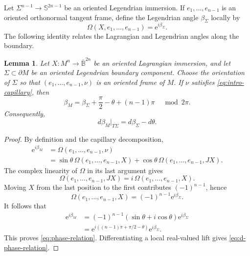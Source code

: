 \documentclass[11pt,a4paper]{article}
\numberwithin{equation}{section}
\newtheorem{lemma}[theorem]{Lemma}
\newcommand{\B}{\mathbb B}
\newcommand{\Sph}{\mathbb S}
\newcommand{\ee}{\mathrm e}
\begin{document}
Let $\Sigma^{n-1}\to\Sph^{2n-1}$ be an oriented Legendrian immersion.  If $e_1,\ldots,e_{n-1}$ is an oriented orthonormal tangent frame, define the Legendrian angle $\beta_\Sigma$ locally by
\begin{equation*}
        \Omega(X,e_1,\ldots,e_{n-1})=\ee^{i\beta_\Sigma}.
\end{equation*}
The following identity relates the Lagrangian and Legendrian angles along the boundary.

\begin{lemma}\label{lem:phase-relation}
Let $X:M^n\to\overline{\B}^{2n}$ be an oriented Lagrangian immersion, and let $\Sigma\subset\partial M$ be an oriented Legendrian boundary component.  Choose the orientation of $\Sigma$ so that $(e_1,\ldots,e_{n-1},\nu)$ is an oriented frame of $M$.  If $\nu$ satisfies \eqref{eq:intro-capillary}, then
\begin{equation}\label{eq:phase-relation}
        \beta_M
        =\beta_\Sigma+\frac\pi2-\theta+(n-1)\pi
        \quad\bmod 2\pi.
\end{equation}
Consequently,
\begin{equation}\label{eq:d-phase-relation}
        d\beta_M|_{T\Sigma}
        =d\beta_\Sigma-d\theta.
\end{equation}
\end{lemma}

\begin{proof}
By definition and the capillary decomposition,
$$
\begin{aligned}
        \ee^{i\beta_M}
        &=\Omega(e_1,\ldots,e_{n-1},\nu)\\
        &=\sin\theta\,\Omega(e_1,\ldots,e_{n-1},X)
          +\cos\theta\,\Omega(e_1,\ldots,e_{n-1},JX).
\end{aligned}
$$
The complex linearity of $\Omega$ in its last argument gives
$$
        \Omega(e_1,\ldots,e_{n-1},JX)
        =i\,\Omega(e_1,\ldots,e_{n-1},X).
$$
Moving $X$ from the last position to the first contributes $(-1)^{n-1}$, hence
$$
        \Omega(e_1,\ldots,e_{n-1},X)
        =(-1)^{n-1}\ee^{i\beta_\Sigma}.
$$
It follows that
$$
\begin{aligned}
        \ee^{i\beta_M}
        &=(-1)^{n-1}(\sin\theta+i\cos\theta)\ee^{i\beta_\Sigma}\\
        &=\ee^{i((n-1)\pi+\pi/2-\theta)}\ee^{i\beta_\Sigma}.
\end{aligned}
$$
This proves \eqref{eq:phase-relation}.  Differentiating a local real-valued lift gives \eqref{eq:d-phase-relation}.
\end{proof}
\end{document}
